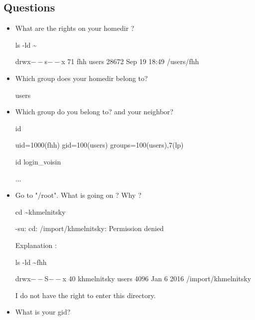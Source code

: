 \documentclass[11pt]{article}
\begin{document}
\subsection{Questions}

\begin{itemize}
	\item What are the rights on your homedir ?
	\begin{solution}
		
		ls -ld \textasciitilde{}
		
		drwx$--$s$--$x 71 fhh users 28672 Sep 19 18:49 /users/fhh
		
	\end{solution}
	\item Which group does your homedir belong to?
	\begin{solution}
		users
	\end{solution}
	\item Which group do you belong to? and your neighbor?
	\begin{solution}
		id
		
		uid=1000(fhh) gid=100(users) groups=100(users),7(lp)
		
		id login\_voisin
		
		...
		
	\end{solution}
	\item Go to  "/root". What is going on ? Why ?
	\begin{solution}
		
		cd \textasciitilde{}khmelnitsky
		
		-su: cd: /import/khmelnitsky: Permission denied
		
		Explanation :
		
		ls -ld \textasciitilde{}fhh
		
		drwx$--$S$--$x 40 khmelnitsky users 4096 Jan  6  2016 /import/khmelnitsky
		
		I do not have the right to enter this directory.
	\end{solution}
	\item What is your gid?
	\begin{solution}
		

\end{solution}
\end{itemize}
\end{document}
